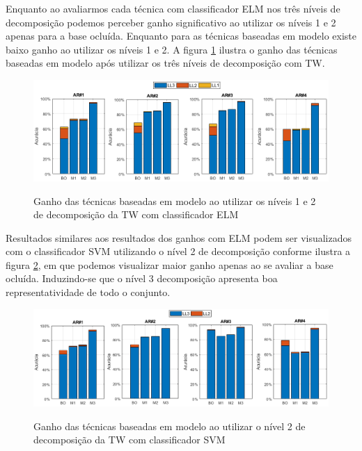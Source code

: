 Enquanto ao avaliarmos cada técnica com classificador ELM nos três níveis de decomposição podemos perceber ganho significativo ao utilizar os níveis 1 e 2 apenas para a base ocluída. Enquanto para as técnicas baseadas em modelo existe baixo ganho ao utilizar os níveis 1 e 2. A figura \ref{fig:acuracia_ganho_modelo_ELM} ilustra o ganho das técnicas baseadas em modelo após utilizar os três níveis de decomposição com TW. 

\begin{figure}[H]
\centering
\caption{Ganho das técnicas baseadas em modelo ao utilizar os níveis 1 e 2 de decomposição da TW com classificador ELM }
\includegraphics[scale=0.52]{imgs4/ganhos/ganho_modelo_ELM_niveis}
\label{fig:acuracia_ganho_modelo_ELM}
\end{figure}


Resultados similares aos resultados dos ganhos com ELM podem ser visualizados com o classificador SVM utilizando o nível 2 de decomposição conforme ilustra a figura \ref{fig:acuracia_ganho_modelo_SVM}, em que podemos visualizar maior ganho apenas ao se avaliar a base ocluída. Induzindo-se que o nível 3 decomposição apresenta boa representatividade de todo o conjunto.

\begin{figure}[H]
\centering
\caption{Ganho das técnicas baseadas em modelo ao utilizar o nível 2 de decomposição da TW com classificador SVM }
\includegraphics[scale=0.52]{imgs4/ganhos/ganho_modelo_SVM_niveis}
\label{fig:acuracia_ganho_modelo_SVM}
\end{figure}



